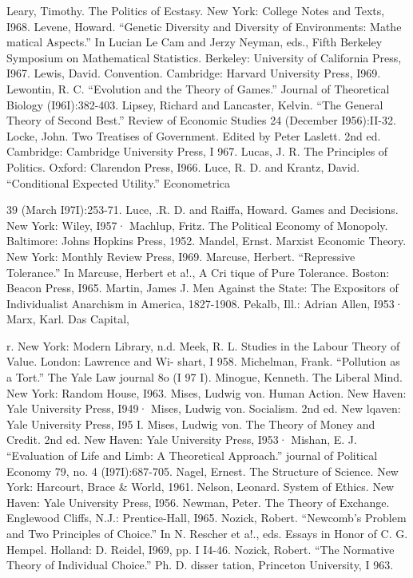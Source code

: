 \documentclass[11pt,openany]{book}
\begin{document}
{Leary, Timothy. The Politics of Ecstasy. New York: College Notes and Texts, I968. Levene, Howard. ``Genetic Diversity and Diversity of Environments: Mathe matical Aspects.'' In Lucian Le Cam and Jerzy Neyman, eds., Fifth Berkeley Symposium on Mathematical Statistics. Berkeley: University of California Press, I967. Lewis, David. Convention. Cambridge: Harvard University Press, I969. Lewontin, R. C. ``Evolution and the Theory of Games.'' Journal of Theoretical Biology (I96I):382-403. Lipsey, Richard and Lancaster, Kelvin. ``The General Theory of Second Best.'' Review of Economic Studies 24 (December I956):II-32. Locke, John. Two Treatises of Government. Edited by Peter Laslett. 2nd ed. Cambridge: Cambridge University Press, I 967. Lucas, J. R. The Principles of Politics. Oxford: Clarendon Press, I966. Luce, R. D. and Krantz, David. ``Conditional Expected Utility.'' Econometrica\par

39 (March I97I):253-71. Luce, .R. D. and Raiffa, Howard. Games and Decisions. New York: Wiley, I957· Machlup, Fritz. The Political Economy of Monopoly. Baltimore: Johns Hopkins Press, 1952. Mandel, Ernst. Marxist Economic Theory. New York: Monthly Review Press, I969. Marcuse, Herbert. ``Repressive Tolerance.'' In Marcuse, Herbert et a!., A Cri tique of Pure Tolerance. Boston: Beacon Press, I965. Martin, James J. Men Against the State: The Expositors of Individualist Anarchism in America, 1827-1908. Pekalb, Ill.: Adrian Allen, I953· Marx, Karl. Das Capital,\par

r. New York: Modern Library, n.d. Meek, R. L. Studies in the Labour Theory of Value. London: Lawrence and Wi- shart, I 958. Michelman, Frank. ``Pollution as a Tort.'' The Yale Law journal 8o (I 97 I). Minogue, Kenneth. The Liberal Mind. New York: Random House, I963. Mises, Ludwig von. Human Action. New Haven: Yale University Press, I949· Mises, Ludwig von. Socialism. 2nd ed. New lqaven: Yale University Press, I95 I. Mises, Ludwig von. The Theory of Money and Credit. 2nd ed. New Haven: Yale University Press, I953· Mishan, E. J. ``Evaluation of Life and Limb: A Theoretical Approach.'' journal of Political Economy 79, no. 4 (I97I):687-705. Nagel, Ernest. The Structure of Science. New York: Harcourt, Brace \& World, 1961. Nelson, Leonard. System of Ethics. New Haven: Yale University Press, I956. Newman, Peter. The Theory of Exchange. Englewood Cliffs, N.J.: Prentice-Hall, I965. Nozick, Robert. ``Newcomb's Problem and Two Principles of Choice.'' In N. Rescher et a!., eds. Essays in Honor of C. G. Hempel. Holland: D. Reidel, I969, pp. I I4-46. Nozick, Robert. ``The Normative Theory of Individual Choice.'' Ph. D. disser tation, Princeton University, I 963.\par

}
\end{document}
